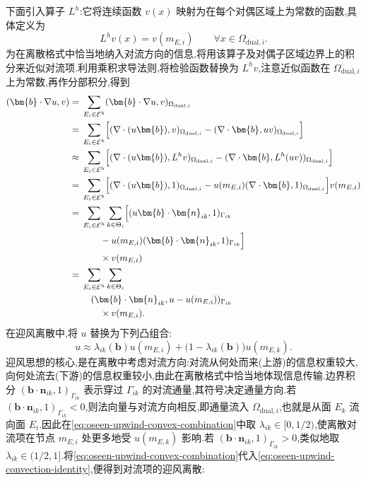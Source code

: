 \begin{note}[最低阶非协调有限元的迎风离散]
下面引入算子 $L^h$:它将连续函数 $v(x)$ 映射为在每个对偶区域上为常数的函数,具体定义为
\[
  L^h v(x)=v(m_{E,i})
  \qquad\forall x\in\Omega_{\mathrm{dual},i}.
\]
为在离散格式中恰当地纳入对流方向的信息,将用该算子及对偶子区域边界上的积分来近似对流项.利用乘积求导法则,将检验函数替换为 $L^h v$,注意近似函数在 $\Omega_{\mathrm{dual},i}$ 上为常数,再作分部积分,得到
{\small
\begin{equation}\label{eq:oseen-upwind-convection-identity}
\begin{aligned}
 (\bm{b}\cdot\nabla u,v)
  ={}&\sum_{E_i\in\mathcal{E}^h}
      (\bm{b}\cdot\nabla u,v)_{\Omega_{\mathrm{dual},i}}\\
  ={}&\sum_{E_i\in\mathcal{E}^h}
      \Bigl[(\nabla\cdot(u\bm{b}),v)_{\Omega_{\mathrm{dual},i}}
       -(\nabla\cdot\bm{b},uv)_{\Omega_{\mathrm{dual},i}}\Bigr]\\
  \approx{}&\sum_{E_i\in\mathcal{E}^h}
      \Bigl[(\nabla\cdot(u\bm{b}),L^h v)_{\Omega_{\mathrm{dual},i}}
       -(\nabla\cdot\bm{b},L^h(uv))_{\Omega_{\mathrm{dual},i}}\Bigr]\\
  ={}&\sum_{E_i\in\mathcal{E}^h}
      \Bigl[(\nabla\cdot(u\bm{b}),1)_{\Omega_{\mathrm{dual},i}}
       -u(m_{E,i})(\nabla\cdot\bm{b},1)_{\Omega_{\mathrm{dual},i}}\Bigr]
       v(m_{E,i})\\
  ={}&\sum_{E_i\in\mathcal{E}^h}\sum_{k\in\Theta_i}
      \Bigl[(u\bm{b}\cdot\bm{n}_{ik},1)_{\Gamma_{ik}}\\
  &\qquad-u(m_{E,i})(\bm{b}\cdot\bm{n}_{ik},1)_{\Gamma_{ik}}\Bigr]\\
  &\qquad{}\times v(m_{E,i})\\
  ={}&\sum_{E_i\in\mathcal{E}^h}\sum_{k\in\Theta_i}\\
  &\quad(\bm{b}\cdot\bm{n}_{ik},u-u(m_{E,i}))_{\Gamma_{ik}}\\
  &\qquad{}\times v(m_{E,i}).
\end{aligned}
\end{equation}
}
在迎风离散中,将 $u$ 替换为下列凸组合:
\begin{equation}\label{eq:oseen-upwind-convex-combination}
  u\approx\lambda_{ik}(\bm{b})u(m_{E,i})
    +\bigl(1-\lambda_{ik}(\bm{b})\bigr)u(m_{E,k}).
\end{equation}
迎风思想的核心,是在离散中考虑对流方向:对流从何处而来(上游)的信息权重较大,向何处流去(下游)的信息权重较小,由此在离散格式中恰当地体现信息传输.边界积分 $(\bm{b}\cdot\bm{n}_{ik},1)_{\Gamma_{ik}}$ 表示穿过 $\Gamma_{ik}$ 的对流通量,其符号决定通量方向.若 $(\bm{b}\cdot\bm{n}_{ik},1)_{\Gamma_{ik}}<0$,则法向量与对流方向相反,即通量流入 $\Omega_{\mathrm{dual},i}$,也就是从面 $E_k$ 流向面 $E_i$.因此在\cref{eq:oseen-upwind-convex-combination}中取 $\lambda_{ik}\in[0,1/2)$,使离散对流项在节点 $m_{E,i}$ 处更多地受 $u(m_{E,k})$ 影响.若 $(\bm{b}\cdot\bm{n}_{ik},1)_{\Gamma_{ik}}>0$,类似地取 $\lambda_{ik}\in(1/2,1]$.将\cref{eq:oseen-upwind-convex-combination}代入\cref{eq:oseen-upwind-convection-identity},便得到对流项的迎风离散:

\end{note}
